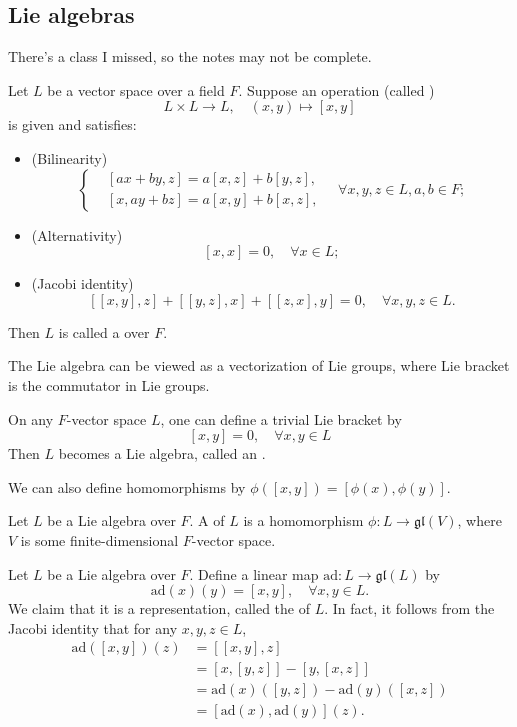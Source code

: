 \subsection{Lie algebras}
\label{sub:Lie algebras}

There's a class I missed, so the notes may not be complete.

\begin{definition}
	Let $L$ be a vector space over a field $F$. Suppose an operation
	(called )
	\[
		L\times L \to L, \quad (x, y) \mapsto [x, y]
	\]
	is given and satisfies:
	\begin{itemize}
		\item (Bilinearity)
			\[
			\left\{\begin{aligned}
					&[ax+by,z] = a[x,z]+b[y,z],\\
					&[x,ay+bz] = a[x,y]+b[x,z],
			\end{aligned}
			\right. \quad \forall x,y,z\in L, a,b\in F;
			\]
		\item (Alternativity)
			\[
				[x, x] = 0, \quad \forall x\in L;
			\]
		\item (Jacobi identity)
			\[
				[[x, y], z] + [[y, z], x] + [[z, x], y] = 0,\quad \forall x,y,z\in L.
			\]
	\end{itemize}
	Then $L$ is called a  over $F$.
\end{definition}
The Lie algebra can be viewed as a vectorization of Lie groups,
where Lie bracket is the commutator in Lie groups.

\begin{example}
    On any $F$-vector space $L$, one can define a trivial Lie bracket by
	\[
		[x, y] = 0,\quad \forall x,y\in L
	\]
	Then $L$ becomes a Lie algebra, called an .
\end{example}

We can also define homomorphisms by $\phi([x, y]) = [\phi(x), \phi(y)]$.

\begin{definition}[Representation]
	Let $L$ be a Lie algebra over $F$. A  of $L$ is
	a homomorphism $\phi: L\to \mathfrak{gl}(V)$, where $V$ is some
	finite-dimensional $F$-vector space.
\end{definition}

\begin{example}
    Let $L$ be a Lie algebra over $F$. Define a linear map
	$\mathrm{ad}: L\to \mathfrak{gl}(L)$ by
	\[
		\mathrm{ad}(x)(y) = [x, y],\quad \forall x, y\in L.
	\]
	We claim that it is a representation, called the 
	of $L$. In fact, it follows from the Jacobi identity that for any $x,y,z\in L$,
	\begin{align*}
		\mathrm{ad}([x, y])(z) &= [[x,y],z]\\
		& = [x, [y, z]] - [y, [x, z]]\\
		& = \mathrm{ad}(x)([y, z]) - \mathrm{ad}(y)([x, z])\\
		& = [\mathrm{ad}(x), \mathrm{ad}(y)](z).
	\end{align*}
\end{example}

